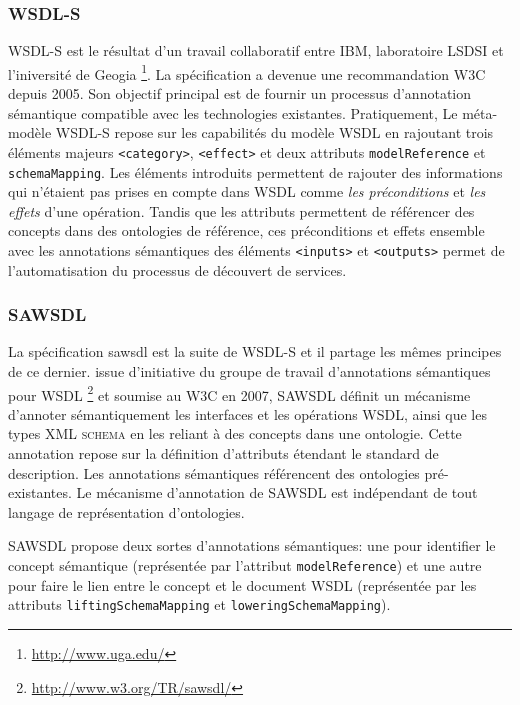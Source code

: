     \subsubsection{WSDL-S}
    \textsc{WSDL-S} \cite{akkiraju2005web} est le résultat d'un
    travail collaboratif entre IBM, laboratoire LSDSI et l'iniversité
    de Geogia \footnote{\url{http://www.uga.edu/}}.  La spécification
    a devenue une recommandation \textsc{W3C} depuis 2005. Son
    objectif principal est de fournir un processus d'annotation
    sémantique compatible avec les technologies
    existantes. Pratiquement, Le méta-modèle \textsc{WSDL-S} repose
    sur les capabilités du modèle \textsc{WSDL} en rajoutant trois
    éléments majeurs \texttt{<category>}, \texttt{<effect>} et deux
    attributs \texttt{modelReference} et \texttt{schemaMapping}. Les
    éléments introduits permettent de rajouter des informations qui
    n'étaient pas prises en compte dans \textsc{WSDL} comme \emph{les
      préconditions} et \emph{les effets} d'une opération. Tandis que
    les attributs permettent de référencer des concepts dans des
    ontologies de référence, ces préconditions et effets ensemble avec
    les annotations sémantiques des éléments \texttt{<inputs>} et
    \texttt{<outputs>} permet de l'automatisation du processus de
    découvert de services.

    \subsubsection{SAWSDL}
    La spécification \acrshort{sawsdl} \cite{kopecky2007sawsdl} est la
    suite de \textsc{WSDL-S} et il partage les mêmes principes de ce
    dernier. issue d'initiative du groupe de travail d'annotations
    sémantiques pour \textsc{WSDL}
    \footnote{\url{http://www.w3.org/TR/sawsdl/}} et soumise au
    \textsc{W3C} en 2007, \textsc{SAWSDL} définit un mécanisme
    d'annoter sémantiquement les interfaces et les opérations
    \textsc{WSDL}, ainsi que les types \textsc{XML schema} en les
    reliant à des concepts dans une ontologie. Cette annotation repose
    sur la définition d'attributs étendant le standard de
    description. Les annotations sémantiques référencent des
    ontologies pré-existantes. Le mécanisme d'annotation de
    \textsc{SAWSDL} est indépendant de tout langage de représentation
    \cite{lopez2008selection} d'ontologies.

    \textsc{SAWSDL} propose deux sortes d'annotations sémantiques: une
    pour identifier le concept sémantique (représentée par l'attribut
    \texttt{modelReference}) et une autre pour faire le lien entre le
    concept et le document \textsc{WSDL} (représentée par les
    attributs \texttt{liftingSchemaMapping} et
    \texttt{loweringSchemaMapping}).

